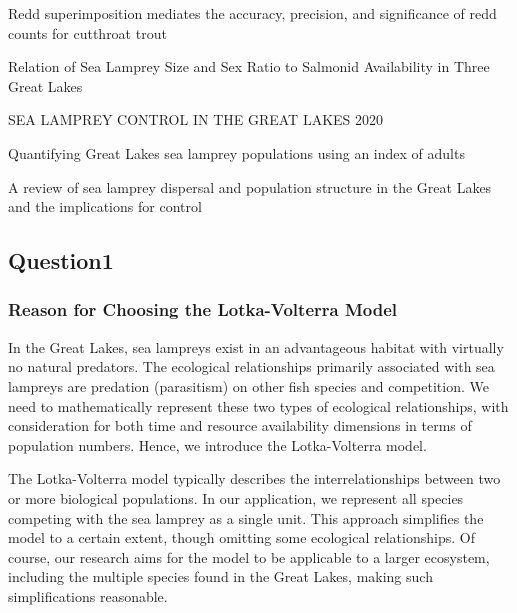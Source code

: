 \documentclass[12pt]{article}
\begin{document}
Redd superimposition mediates the accuracy, precision, and significance of redd counts for cutthroat trout\cite{baldock_redd_2023}

Relation of Sea Lamprey Size and Sex Ratio to Salmonid Availability in Three Great Lakes\cite{houston_relation_1991}

SEA LAMPREY CONTROL IN THE GREAT LAKES 2020\cite{barber_sea_nodate}

Quantifying Great Lakes sea lamprey populations using an index of adults\cite{adams_quantifying_2021}

A review of sea lamprey dispersal and population structure in the Great Lakes and the implications for control\cite{docker_review_2021}

\subsection{Question1}
\subsubsection{Reason for Choosing the Lotka-Volterra Model}

In the Great Lakes, sea lampreys exist in an advantageous habitat with virtually no natural predators.
The ecological relationships primarily associated with sea lampreys are predation (parasitism) on other
fish species and competition. We need to mathematically represent these two types of ecological
relationships, with consideration for both time and resource availability dimensions in terms of
population numbers. Hence, we introduce the Lotka-Volterra model.

The Lotka-Volterra model typically describes the interrelationships between two or more biological
populations. In our application, we represent all species competing with the sea lamprey as a single
unit. This approach simplifies the model to a certain extent, though omitting some ecological
relationships. Of course, our research aims for the model to be applicable to a larger ecosystem,
including the multiple species found in the Great Lakes, making such simplifications reasonable.
\end{document}
